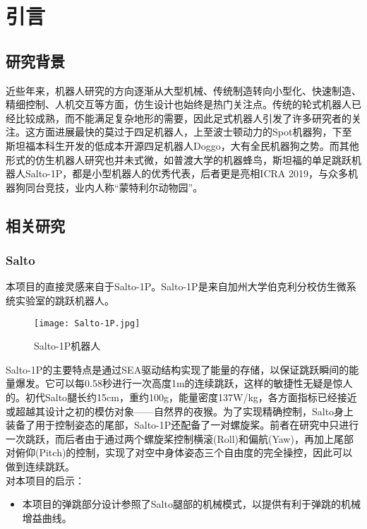 
\chapter{引言}
\label{cha:intro}

\section{研究背景}
近些年来，机器人研究的方向逐渐从大型机械、传统制造转向小型化、快速制造、精细控制、人机交互等方面，仿生设计也始终是热门关注点。传统的轮式机器人已经比较成熟，而不能满足复杂地形的需要，因此足式机器人引发了许多研究者的关注。这方面进展最快的莫过于四足机器人，上至波士顿动力的Spot机器狗\cite{Spot}，下至斯坦福本科生开发的低成本开源四足机器人Doggo\cite{Doggo}，大有全民机器狗之势。而其他形式的仿生机器人研究也并未式微，如普渡大学的机器蜂鸟\cite{Hummingbird}，斯坦福的单足跳跃机器人Salto-1P\cite{Salto1P}，都是小型机器人的优秀代表，后者更是亮相ICRA 2019，与众多机器狗同台竞技，业内人称“蒙特利尔动物园”。

\section{相关研究}
\label{sec:first}
\subsection{Salto}
本项目的直接灵感来自于Salto-1P。Salto-1P是来自加州大学伯克利分校仿生微系统实验室的跳跃机器人。
\begin{figure}[H]
  \centering
  \texttt{[image: Salto-1P.jpg]}
  \caption{Salto-1P机器人\cite{Salto1P}}
  \label{fig:salto-1p}
\end{figure}
Salto-1P的主要特点是通过SEA驱动结构实现了能量的存储，以保证跳跃瞬间的能量爆发。它可以每0.58秒进行一次高度1m的连续跳跃，这样的敏捷性无疑是惊人的。初代Salto\cite{Salto}腿长约15cm，重约100g，能量密度137W/kg，各方面指标已经接近或超越其设计之初的模仿对象——自然界的夜猴。为了实现精确控制，Salto身上装备了用于控制姿态的尾部，Salto-1P还配备了一对螺旋桨。前者在研究中只进行一次跳跃，而后者由于通过两个螺旋桨控制横滚(Roll)和偏航(Yaw)，再加上尾部对俯仰(Pitch)的控制，实现了对空中身体姿态三个自由度的完全操控，因此可以做到连续跳跃。\\
对本项目的启示：
\begin{itemize}
  \item 本项目的弹跳部分设计参照了Salto腿部的机械模式，以提供有利于弹跳的机械增益曲线。
\end{itemize}
